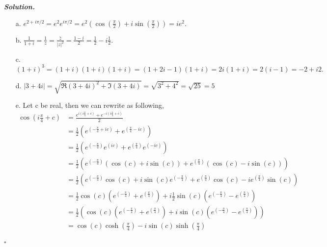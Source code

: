 \documentclass[12pt]{report}
\newenvironment{solution}[1][\it{Solution}]{\textbf{#1. } }{$\square$}
\begin{document}
\begin{solution}

    \noindent
    \begin{enumerate}
        \item [a.] $e^{2+i\pi/2} = e^{2}e^{i\pi/2}=e^{2}\left(\cos(\frac{\pi}{2}) + i \sin(\frac{\pi}{2})\right) = ie^{2}.$
        \item [b.] $\frac{1}{1+i} = \frac{1}{z} = \frac{\bar{z}}{|z|^2} = \frac{1-i}{2} = \frac{1}{2} - i \frac{1}{2}.$
        \item [c.] $(1+i)^3 = (1+i)(1+i)(1+i) = (1+2i-1)(1+i) = 2i(1+i) = 2(i - 1) = -2 + i2.$
        \item [d.] $|3+4i| = \sqrt{\Re(3+4i)^2 + \Im(3+4i)} = \sqrt{3^2 + 4^2} = \sqrt{25} = 5$
        \item [e.] Let c be real, then we can rewrite as following,
        \begin{align*}
            \cos(i \frac{\pi}{4} + c) &= \frac{e^{i(i \frac{\pi}{4} + c)}+e^{-i(i \frac{\pi}{4} + c)}}{2}\\ 
            &= \frac{1}{2}\left(e^{(-\frac{\pi}{4} + ic)}+e^{(\frac{\pi}{4} - ic)}\right)\\
            &= \frac{1}{2}\left(e^{(-\frac{\pi}{4})}e^{(ic)}+e^{(\frac{\pi}{4})} e^{(-ic)} \right)\\
            &= \frac{1}{2}\left(e^{(-\frac{\pi}{4})}(\cos(c)+i\sin(c))+e^{(\frac{\pi}{4})}(\cos(c)-i\sin(c))  \right)\\
            &= \frac{1}{2}\left(e^{(-\frac{\pi}{4})}\cos(c)+i\sin(c)e^{(-\frac{\pi}{4})}+e^{(\frac{\pi}{4})}\cos(c)-ie^{(\frac{\pi}{4})}\sin(c)  \right)\\
            &= \frac{1}{2}\cos(c)\left(e^{(-\frac{\pi}{4})}+e^{(\frac{\pi}{4})}\right)+i\frac{1}{2}\sin(c)\left(e^{(-\frac{\pi}{4})}-e^{(\frac{\pi}{4})}\right)\\
            &= \frac{1}{2}\left(\cos(c)\left(e^{(-\frac{\pi}{4})}+e^{(\frac{\pi}{4})}\right)+i\sin(c)\left(e^{(-\frac{\pi}{4})}-e^{(\frac{\pi}{4})}\right)\right)\\
            &=\cos(c)\cosh\left(\frac{\pi}{4}\right) - i\sin(c)\sinh\left(\frac{\pi}{4}\right)\\
        \end{align*}
    \end{enumerate}
\end{solution}

\end{document}
